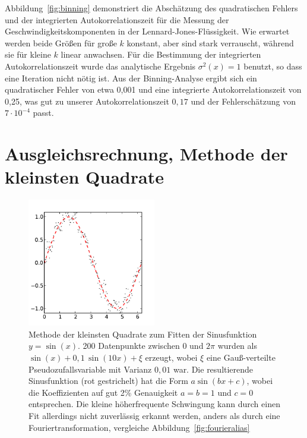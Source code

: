 Abbildung~\ref{fig:binning} demonstriert die Abschätzung des
quadratischen Fehlers und der integrierten Autokorrelationszeit für
die Messung der Geschwindigkeitskomponenten in der
Lennard-Jones-Flüssigkeit. Wie erwartet werden beide Größen für große
$k$ konstant, aber sind stark verrauscht, während sie für kleine $k$
linear anwachsen.  Für die Bestimmung der integrierten
Autokorrelationszeit wurde das analytische Ergebnis $\sigma^2(x)=1$
benutzt, so dass eine Iteration nicht nötig ist. Aus der
Binning-Analyse ergibt sich ein quadratischer Fehler von etwa 0,001
und eine integrierte Autokorrelationszeit von 0,25, was gut zu unserer
Autokorrelationszeit $0,17$ und der Fehlerschätzung von $7\cdot
10^{-4}$ passt.

\section{Ausgleichsrechnung, Methode der kleinsten Quadrate}

\begin{figure}
  \centering
  \includegraphics[width=0.5\textwidth]{plots/leastsq}
  \caption{Methode der kleinsten Quadrate zum Fitten der Sinusfunktion
    $y=\sin(x)$. 200 Datenpunkte zwischen 0 und $2\pi$ wurden als
    $\sin(x) + 0,1\,\sin(10 x) + \xi$ erzeugt, wobei $\xi$ eine
    Gauß-verteilte Pseudozufallsvariable mit Varianz $0,01$ war. Die
    resultierende Sinusfunktion (rot gestrichelt) hat die Form $a
    \sin(bx+c)$, wobei die Koeffizienten auf gut 2\% Genauigkeit
    $a=b=1$ und $c=0$ entsprechen. Die kleine höherfrequente
    Schwingung kann durch einen Fit allerdings nicht zuverlässig
    erkannt werden, anders als durch eine Fouriertransformation,
    vergleiche Abbildung~\ref{fig:fourieralias}}
  \label{fig:leastsq}
\end{figure}

